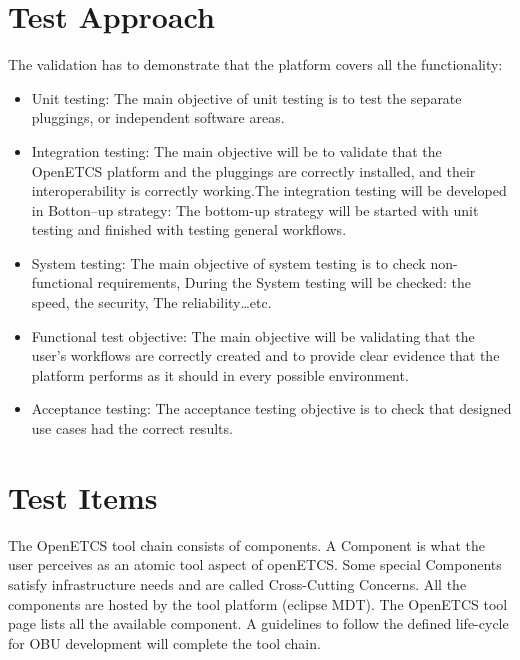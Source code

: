 \section{Test Approach}
\label{sec:test_stra}

The validation has to demonstrate that the platform covers all the functionality:
\begin{itemize}
\item Unit testing: The main objective of unit testing is to test the separate pluggings, or independent software areas.
\item Integration testing: The main objective will be to validate that the OpenETCS platform and the pluggings are correctly installed, and their interoperability is correctly working.The integration testing will be developed in Botton–up strategy: The bottom-up strategy will be started with unit testing and finished with testing general workflows.
\item System testing: The main objective of system testing is to check non-functional requirements, During the System testing will be checked: the speed, the security, The reliability…etc.
\item Functional test objective: The main objective will be validating that the user’s workflows are correctly created and to provide clear evidence that the platform performs as it should in every possible environment.
\item Acceptance testing: The acceptance testing objective is to check that designed use cases had the correct results.
\end{itemize}

\section{Test Items}
\label{sec:test_items}
The OpenETCS tool chain consists of components. A Component is what the user perceives as an atomic tool aspect of openETCS. Some special Components satisfy infrastructure needs and are called Cross-Cutting Concerns. All the components are hosted by the tool platform (eclipse MDT). The OpenETCS tool page lists all the available component. A guidelines to follow the defined life-cycle for OBU development will complete the tool chain.

